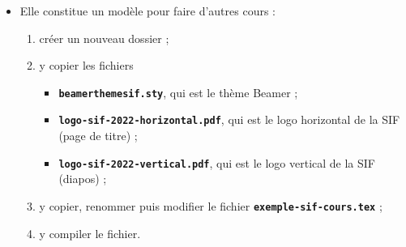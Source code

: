   \begin{itemize}
  \item Elle constitue un modèle pour faire d'autres cours :
      
    \begin{enumerate}
    \item créer un nouveau dossier ;
    \item y copier les fichiers 
      
      \begin{itemize}
      \item \texttt{\textbf{beamerthemesif.sty}}, qui est le thème Beamer ;
      \item \texttt{\textbf{logo-sif-2022-horizontal.pdf}}, qui est le logo horizontal de la SIF (page de titre) ;
      \item \texttt{\textbf{logo-sif-2022-vertical.pdf}}, qui est le logo vertical de la SIF (diapos) ;
      \end{itemize}
      
    \item y copier, renommer puis modifier le fichier \texttt{\textbf{exemple-sif-cours.tex}} ;
    \item y compiler le fichier.
    \end{enumerate}
  \end{itemize}

